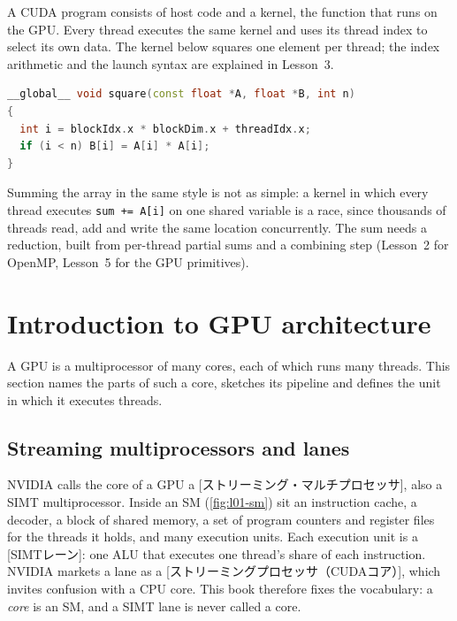 \documentclass[../main.tex]{subfiles}
\begin{document}
A CUDA program consists of host code and a kernel, the function that
runs on the GPU.  Every thread executes the same kernel and uses its
thread index to select its own data.  The kernel below squares one
element per thread; the index arithmetic and the launch syntax are
explained in Lesson~3.
\begin{lstlisting}[language=C++, numbers=none]
__global__ void square(const float *A, float *B, int n)
{
  int i = blockIdx.x * blockDim.x + threadIdx.x;
  if (i < n) B[i] = A[i] * A[i];
}
\end{lstlisting}
Summing the array in the same style is not as simple: a kernel in which
every thread executes \texttt{sum += A[i]} on one shared variable is a
race, since thousands of threads read, add and write the same location
concurrently.  The sum needs a reduction, built from per-thread partial
sums and a combining step (Lesson~2 for OpenMP, Lesson~5 for the GPU
primitives).

\section{Introduction to GPU architecture}
\label{sec:l01-gpu-architecture}

A GPU is a multiprocessor of many cores, each of which runs many threads.
This section names the parts of such a core, sketches its pipeline and
defines the unit in which it executes threads.

\subsection{Streaming multiprocessors and lanes}

NVIDIA calls the core of a GPU a
[ストリーミング・マルチプロセッサ],
also a SIMT multiprocessor.  Inside an SM
(\cref{fig:l01-sm}) sit an instruction cache, a decoder, a block of
shared memory, a set of program counters and register files for the
threads it holds, and many execution units.  Each execution unit is a
[SIMTレーン]: one ALU that executes one thread's share
of each instruction.  NVIDIA markets a lane as a
[ストリーミングプロセッサ（CUDAコア）],
which invites confusion with a CPU core.  This book therefore fixes the
vocabulary: a \emph{core} is an SM, and a SIMT lane is never called a
core.
\end{document}
